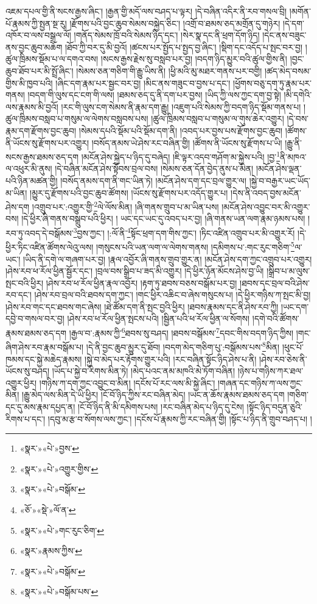 འཇམ་དཔལ་གྱི་ནི་སངས་རྒྱས་ཞིང་། །རྒྱན་གྱི་མདོ་ལས་བཤད་པ་ལྟར། །དེ་བཞིན་འདིར་ནི་རབ་གསལ་བྲི། །མགོན་པོ་རྣམས་ཀྱི་སྤྱན་སྔ་རུ། །རྫོགས་པའི་བྱང་ཆུབ་སེམས་བསྐྱེད་ཅིང་། །འགྲོ་བ་ཐམས་ཅད་མགྲོན་དུ་གཉེར། །དེ་དག་འཁོར་བ་ལས་བསྒྲལ་ལོ། །གནོད་སེམས་ཁྲོ་བའི་སེམས་ཉིད་དང་། །སེར་སྣ་དང་ནི་ཕྲག་དོག་ཉིད། །དེང་ནས་བཟུང་ནས་བྱང་ཆུབ་མཆོག །ཐོབ་ཀྱི་བར་དུ་མི་བྱའོ། །ཚངས་པར་སྤྱོད་པ་སྤྱད་བྱ་ཞིང་། །སྡིག་དང་འདོད་པ་སྤང་བར་བྱ། །ཚུལ་ཁྲིམས་སྡོམ་པ་ལ་དགའ་བས། །སངས་རྒྱས་རྗེས་སུ་བསླབ་པར་བྱ། །བདག་ཉིད་མྱུར་བའི་ཚུལ་གྱིས་ནི། །བྱང་ཆུབ་ཐོབ་པར་མི་སྤྲོ་ཞིང་། །སེམས་ཅན་གཅིག་གི་རྒྱུ་ཡིས་ནི། །ཕྱི་མའི་མུ་མཐར་གནས་པར་བགྱི། །ཚད་མེད་བསམ་གྱིས་མི་ཁྱབ་པའི། །ཞིང་དག་རྣམ་པར་སྦྱང་བར་བྱ། །མིང་ནས་གཟུང་བ་བྱས་པ་དང་། །ཕྱོགས་བཅུ་དག་ཏུ་རྣམ་པར་གནས། །བདག་གི་ལུས་དང་ངག་གི་ལས། །ཐམས་ཅད་དུ་ནི་དག་པར་བྱས། །ཡིད་ཀྱི་ལས་ཀྱང་དག་བྱ་སྟེ། །མི་དགེའི་ལས་རྣམས་མི་བྱའོ། །རང་གི་ལུས་ངག་སེམས་ནི་རྣམ་དག་རྒྱུ། །འཇུག་པའི་སེམས་ཀྱི་བདག་ཉིད་སྡོམ་གནས་པ། །ཚུལ་ཁྲིམས་བསླབ་པ་གསུམ་ལ་ལེགས་བསླབས་པས། །ཚུལ་ཁྲིམས་བསླབ་པ་གསུམ་ལ་གུས་ཆེར་འགྱུར། །དེ་བས་རྣམ་དག་རྫོགས་བྱང་ཆུབ། །སེམས་དཔའི་སྡོམ་པའི་སྡོམ་དག་ནི། །འབད་པར་བྱས་པས་རྫོགས་བྱང་ཆུབ། །ཚོགས་ནི་ཡོངས་སུ་རྫོགས་པར་འགྱུར། །བསོད་ནམས་ཡེ་ཤེས་རང་བཞིན་གྱི། །ཚོགས་ནི་ཡོངས་སུ་རྫོགས་པ་ཡི། །རྒྱུ་ནི་སངས་རྒྱས་ཐམས་ཅད་དག །མངོན་ཤེས་སྐྱེད་པ་ཉིད་དུ་བཞེད། །ཇི་ལྟར་འདབ་གཤོག་མ་སྐྱེས་པའི། །བྱ་\footnote{«སྣར་»«པེ་»བྱས་}ནི་མཁའ་ལ་འཕུར་མི་ནུས། །དེ་བཞིན་མངོན་ཤེས་སྟོབས་བྲལ་བས། །སེམས་ཅན་དོན་བྱེད་ནུས་པ་མིན། །མངོན་ཤེས་ལྡན་པའི་ཉིན་མཚན་གྱི། །བསོད་ནམས་དག་ནི་གང་ཡིན་ཏེ། །མངོན་ཤེས་དག་དང་བྲལ་གྱུར་ལ། །སྐྱེ་བ་བརྒྱར་ཡང་ཡོད་མ་ཡིན། །མྱུར་དུ་རྫོགས་པའི་བྱང་ཆུབ་ཚོགས། །ཡོངས་སུ་རྫོགས་པར་འདོད་གྱུར་པ། །དེས་ནི་འབད་བྱས་མངོན་ཤེས་དག །འགྲུབ་པར་:འགྱུར་གྱི་\footnote{«སྣར་»«པེ་»འགྱུར་གྱིས་}ལེ་ལོས་མིན། །ཞི་གནས་གྲུབ་པ་མ་ཡིན་པས། །མངོན་ཤེས་འབྱུང་བར་མི་འགྱུར་བས། །དེ་ཕྱིར་ཞི་གནས་བསྒྲུབ་པའི་ཕྱིར། །
ཡང་དང་ཡང་དུ་འབད་པར་བྱ། །ཞི་གནས་ཡན་ལག་རྣམ་ཉམས་པས། །རབ་ཏུ་འབད་དེ་བསྒོམས་\footnote{«སྣར་»«པེ་»བསྒོམ་}བྱས་ཀྱང་། །:ལོ་ནི་\footnote{«ཅོ་»«སྡེ་»ལོ་ན་}སྟོང་ཕྲག་དག་གིས་ཀྱང་། །ཏིང་འཛིན་འགྲུབ་པར་མི་འགྱུར་རོ། །དེ་ཕྱིར་ཏིང་འཛིན་ཚོགས་ལེའུ་ལས། །གསུངས་པའི་ཡན་ལག་ལ་ལེགས་གནས། །དམིགས་པ་:གང་རུང་གཅིག་\footnote{«སྣར་»«པེ་»གང་རུང་ཅིག་}ལ་ཡང་། །ཡིད་ནི་དགེ་ལ་གཞག་པར་བྱ། །རྣལ་འབྱོར་ཞི་གནས་གྲུབ་གྱུར་ན། །མངོན་ཤེས་དག་ཀྱང་འགྲུབ་པར་འགྱུར། །ཤེས་རབ་ཕ་རོལ་ཕྱིན་སྦྱོར་དང་། །བྲལ་བས་སྒྲིབ་པ་ཟད་མི་འགྱུར། །དེ་ཕྱིར་ཉོན་མོངས་ཤེས་བྱ་ཡི། །སྒྲིབ་པ་མ་ལུས་སྤང་བའི་ཕྱིར། །ཤེས་རབ་ཕ་རོལ་ཕྱིན་རྣལ་འབྱོར། །རྟག་ཏུ་ཐབས་བཅས་བསྒོམ་པར་བྱ། །ཐབས་དང་བྲལ་བའི་ཤེས་རབ་དང་། །ཤེས་རབ་བྲལ་བའི་ཐབས་དག་ཀྱང་། །གང་ཕྱིར་འཆིང་བ་ཞེས་གསུངས་པ། །དེ་ཕྱིར་གཉིས་ཀ་སྤང་མི་བྱ། །ཤེས་རབ་གང་དང་ཐབས་གང་ཞེས། །ཐེ་ཚོམ་དག་ནི་སྤང་བྱའི་ཕྱིར། །ཐབས་རྣམས་དང་ནི་ཤེས་རབ་ཀྱི། །ཡང་དག་དབྱེ་བ་གསལ་བར་བྱ། །ཤེས་རབ་ཕ་རོལ་ཕྱིན་སྤངས་པའི། །སྦྱིན་པའི་ཕ་རོལ་ཕྱིན་ལ་སོགས། །དགེ་བའི་ཚོགས་རྣམས་ཐམས་ཅད་དག །རྒྱལ་བ་:རྣམས་ཀྱི་\footnote{«སྣར་»རྣམས་ཀྱིས་}ཐབས་སུ་བཤད། །ཐབས་བསྒོམས་\footnote{«སྣར་»«པེ་»བསྒོམ་}དབང་གིས་བདག་ཉིད་ཀྱིས། །གང་ཞིག་ཤེས་རབ་རྣམ་བསྒོམ་པ། །དེ་ནི་བྱང་ཆུབ་མྱུར་དུ་ཐོབ། །བདག་མེད་གཅིག་པུ་:བསྒོམས་པས་\footnote{«སྣར་»«པེ་»བསྒོམ་པས་}མིན། །ཕུང་པོ་ཁམས་དང་སྐྱེ་མཆེད་རྣམས། །སྐྱེ་བ་མེད་པར་རྟོགས་གྱུར་པའི། །རང་བཞིན་སྟོང་ཉིད་ཤེས་པ་ནི། །ཤེས་རབ་ཅེས་ནི་ཡོངས་སུ་བཤད། །ཡོད་པ་སྐྱེ་བ་རིགས་མིན་ཏེ། །མེད་པའང་ནམ་མཁའི་མེ་ཏོག་བཞིན། །ཉེས་པ་གཉིས་ཀར་ཐལ་འགྱུར་ཕྱིར། །གཉིས་ཀ་དག་ཀྱང་འབྱུང་བ་མིན། །དངོས་པོ་རང་ལས་མི་སྐྱེ་ཞིང་། །གཞན་དང་གཉིས་ཀ་ལས་ཀྱང་མིན། །རྒྱུ་མེད་ལས་མིན་དེ་ཡི་ཕྱིར། །ངོ་བོ་ཉིད་ཀྱིས་རང་བཞིན་མེད། །ཡང་ན་ཆོས་རྣམས་ཐམས་ཅད་དག །གཅིག་དང་དུ་མས་རྣམ་དཔྱད་ན། །ངོ་བོ་ཉིད་ནི་མི་དམིགས་པས། །རང་བཞིན་མེད་པ་ཉིད་དུ་ངེས། །སྟོང་ཉིད་བདུན་ཅུའི་རིགས་པ་དང་། །དབུ་མ་རྩ་བ་སོགས་ལས་ཀྱང་། །དངོས་པོ་རྣམས་ཀྱི་རང་བཞིན་གྱི། །སྟོང་པ་ཉིད་ནི་གྲུབ་བཤད་པ། །
